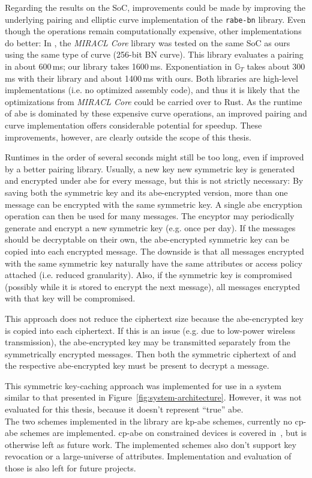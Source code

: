 Regarding the results on the SoC, improvements could be made by improving the underlying pairing and elliptic curve implementation of the \texttt{rabe-bn} library.
Even though the operations remain computationally expensive, other implementations do better:
In \cite{scott_deployment_2020}, the \emph{MIRACL Core} library was tested on the same SoC as ours using the same type of curve (256-bit BN curve).
This library evaluates a pairing in about 600\,ms; our library takes 1600\,ms. 
Exponentiation in $\mathbb{G}_T$ takes about 300\,ms with their library and about 1400\,ms with ours. 
Both libraries are high-level implementations (i.e. no optimized assembly code), and thus it is likely that the optimizations from \emph{MIRACL Core} could be carried over to Rust.
As the runtime of \acrshort{abe} is dominated by these expensive curve operations, an improved pairing and curve implementation offers considerable potential for speedup.
These improvements, however, are clearly outside the scope of this thesis.

Runtimes in the order of several seconds might still be too long, even if improved by a better pairing library.
Usually, a new key new symmetric key is generated and encrypted under \acrshort{abe} for every message, but this is not strictly necessary:
By saving both the symmetric key and its \acrshort{abe}-encrypted version, more than one message can be encrypted with the same symmetric key.
A single \acrshort{abe} encryption operation can then be used for many messages.
The encyptor may periodically generate and encrypt a new symmetric key (e.g. once per day).
If the messages should be decryptable on their own, the \acrshort{abe}-encrypted symmetric key can be copied into each encrypted message.
The downside is that all messages encrypted with the same symmetric key naturally have the same attributes or access policy attached (i.e. reduced granularity).
Also, if the symmetric key is compromised (possibly while it is stored to encrypt the next message), all messages encrypted with that key will be compromised.

This approach does not reduce the ciphertext size because the \acrshort{abe}-encrypted key is copied into each ciphertext.
If this is an issue (e.g. due to low-power wireless transmission), the \acrshort{abe}-encrypted key may be transmitted separately from the symmetrically encrypted messages.
Then both the symmetric ciphertext of and the respective \acrshort{abe}-encrypted key must be present to decrypt a message.

This symmetric key-caching approach was implemented for use in a system similar to that presented in Figure~\ref{fig:system-architecture}.
However, it was not evaluated for this thesis, because it doesn't represent ``true'' \acrlong{abe}.
~\\

The two schemes implemented in the library are \acrshort{kp-abe} schemes, currently no \acrshort{cp-abe} schemes are implemented.
\acrshort{cp-abe} on constrained devices is covered in~\cite{borgh_attribute-based_2016}, but is otherwise left as future work.
The implemented schemes also don't support key revocation or a \gls{large-universe} of attributes. 
Implementation and evaluation of those is also left for future projects.
